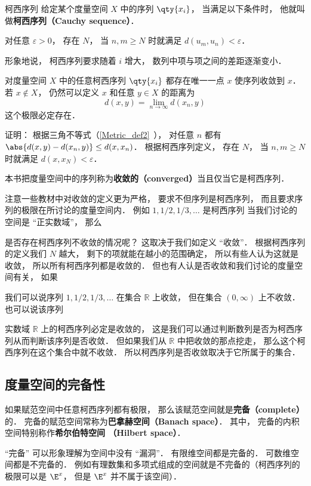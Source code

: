 

\begin{definition}{柯西序列}
给定某个度量空间 $X$ 中的序列 $\qty{x_i}$， 当满足以下条件时， 他就叫做\textbf{柯西序列（Cauchy sequence）}．

对任意 $\varepsilon > 0$， 存在 $N$， 当 $n, m \geqslant N$ 时就满足 $d(u_m, u_n) < \varepsilon$．
\end{definition}

形象地说， 柯西序列要求随着 $i$ 增大， 数列中项与项之间的差距逐渐变小．

\begin{theorem}{}
对度量空间 $X$ 中的任意柯西序列 $\qty{x_i}$ 都存在唯一一点 $x$ 使序列收敛到 $x$． 若 $x \notin X$， 仍然可以定义 $x$ 和任意 $y\in X$ 的距离为
\begin{equation}
d(x, y) = \lim_{n\to\infty} d(x_n, y)
\end{equation}
这个极限必定存在．
\end{theorem}
证明： 根据三角不等式（\autoref{Metric_def2}~）， 对任意 $n$ 都有 $\abs{d(x,y) - d(x_n, y)}\le d(x, x_n)$． 根据柯西序列定义， 存在 $N$， 当 $n, m \geqslant N$ 时就满足 $d(x, x_N) < \varepsilon$．

\begin{definition}{}\label{cauchy_def1}
本书把度量空间中的序列称为\textbf{收敛的（converged）}当且仅当它是柯西序列．
\end{definition}
注意一些教材中对收敛的定义更为严格， 要求不但序列是柯西序列， 而且要求序列的极限在所讨论的度量空间内． 例如 $1, 1/2, 1/3, \dots$ 是柯西序列    当我们讨论的空间是 “正实数域”， 那么



是否存在柯西序列不收敛的情况呢？ 这取决于我们如定义 “收敛”． 根据柯西序列的定义我们 $N$ 越大， 剩下的项就能在越小的范围确定， 所以有些人认为这就是收敛， 所以所有柯西序列都是收敛的． 但也有人认是否收敛和我们讨论的度量空间有关， 如果
\begin{example}{}
我们可以说序列 $1, 1/2, 1/3, \dots$ 在集合 $\mathbb R$ 上收敛， 但在集合 $(0, \infty)$ 上不收敛． 也可以说该序列
\end{example}

实数域 $\mathbb R$ 上的柯西序列必定是收敛的， 这是我们可以通过判断数列是否为柯西序列从而判断该序列是否收敛． 但如果我们从 $\mathbb R$ 中把收敛的那点挖走， 那么这个柯西序列在这个集合中就不收敛． 所以柯西序列是否收敛取决于它所属于的集合． %

\subsection{度量空间的完备性}
如果赋范空间中任意柯西序列都有极限， 那么该赋范空间就是\textbf{完备（complete）}的． 完备的赋范空间常称为\textbf{巴拿赫空间（Banach space）}． 其中， 完备的内积空间特别称作\textbf{希尔伯特空间 （Hilbert space）}．

“完备” 可以形象理解为空间中没有 “漏洞”． 有限维空间都是完备的． 可数维空间都是不完备的． 例如有理数集和多项式组成的空间就是不完备的（柯西序列的极限可以是 $\E^x$， 但是 $\E^x$ 并不属于该空间）．
